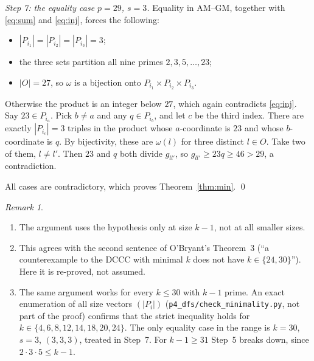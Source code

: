 \documentclass[11pt]{article}
\theoremstyle{definition}
\theoremstyle{remark}
\newtheorem{remark}[theorem]{Remark}
\begin{document}
\emph{Step 7: the equality case $p=29$, $s=3$.} Equality in AM--GM, together with
\eqref{eq:sum} and \eqref{eq:inj}, forces the following:
\begin{itemize}
\item $|P_{i_1}|=|P_{i_2}|=|P_{i_3}|=3$;
\item the three sets partition all nine primes $2,3,5,\dots,23$;
\item $|O|=27$, so $\omega$ is a bijection onto $P_{i_1}\times P_{i_2}\times P_{i_3}$.
\end{itemize}
Otherwise the product is an integer below $27$, which again contradicts \eqref{eq:inj}. Say
$23\in P_{i_a}$. Pick $b\ne a$ and any $q\in P_{i_b}$, and let $c$ be the third index. There are
exactly $|P_{i_c}|=3$ triples in the product whose $a$-coordinate is $23$ and whose $b$-coordinate
is $q$. By bijectivity, these are $\omega(l)$ for three distinct $l\in O$. Take two of them,
$l\ne l'$. Then $23$ and $q$ both divide $g_{ll'}$, so $g_{ll'}\ge23q\ge46>29$, a contradiction.

All cases are contradictory, which proves Theorem~\ref{thm:min}. \qed

\begin{remark}
\begin{enumerate}
\item The argument uses the hypothesis only at size $k-1$, not at all smaller sizes.
\item This agrees with the second sentence of O'Bryant's Theorem~3 (``a counterexample to the
  DCCC with minimal $k$ does not have $k\in\{24,30\}$''). Here it is re-proved, not assumed.
\item The same argument works for every $k\le30$ with $k-1$ prime. An exact enumeration of all
  size vectors $(|P_i|)$ (\texttt{p4\_dfs/check\_minimality.py}, not part of the proof) confirms
  that the strict inequality holds for $k\in\{4,6,8,12,14,18,20,24\}$. The only equality case
  in the range is $k=30$, $s=3$, $(3,3,3)$, treated in Step~7. For $k-1\ge31$ Step~5 breaks down,
  since $2\cdot3\cdot5\le k-1$.
\end{enumerate}
\end{remark}
\end{document}
